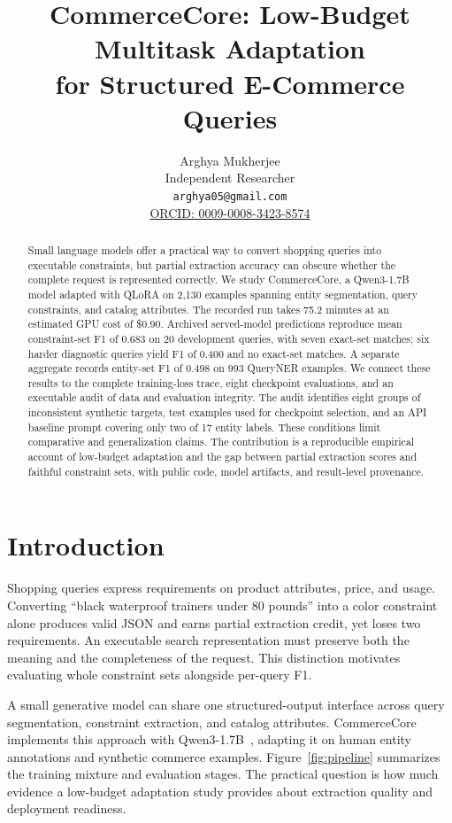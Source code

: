 \documentclass{article}
\title{CommerceCore: Low-Budget Multitask Adaptation\\for Structured E-Commerce Queries}
\author{Arghya Mukherjee\\Independent Researcher\\\texttt{arghya05@gmail.com}\\\href{https://orcid.org/0009-0008-3423-8574}{ORCID: 0009-0008-3423-8574}}
\begin{document}
\maketitle

\begin{abstract}
Small language models offer a practical way to convert shopping queries into executable constraints, but partial extraction accuracy can obscure whether the complete request is represented correctly. We study CommerceCore, a Qwen3-1.7B model adapted with QLoRA on 2,130 examples spanning entity segmentation, query constraints, and catalog attributes. The recorded run takes 75.2 minutes at an estimated GPU cost of \$0.90. Archived served-model predictions reproduce mean constraint-set F1 of 0.683 on 20 development queries, with seven exact-set matches; six harder diagnostic queries yield F1 of 0.400 and no exact-set matches. A separate aggregate records entity-set F1 of 0.498 on 993 QueryNER examples. We connect these results to the complete training-loss trace, eight checkpoint evaluations, and an executable audit of data and evaluation integrity. The audit identifies eight groups of inconsistent synthetic targets, test examples used for checkpoint selection, and an API baseline prompt covering only two of 17 entity labels. These conditions limit comparative and generalization claims. The contribution is a reproducible empirical account of low-budget adaptation and the gap between partial extraction scores and faithful constraint sets, with public code, model artifacts, and result-level provenance.
\end{abstract}

\section{Introduction}
\label{sec:intro}
Shopping queries express requirements on product attributes, price, and usage. Converting ``black waterproof trainers under 80 pounds'' into a color constraint alone produces valid JSON and earns partial extraction credit, yet loses two requirements. An executable search representation must preserve both the meaning and the completeness of the request. This distinction motivates evaluating whole constraint sets alongside per-query F1.

A small generative model can share one structured-output interface across query segmentation, constraint extraction, and catalog attributes. CommerceCore implements this approach with Qwen3-1.7B~\cite{qwen3,qwenmodel}, adapting it on human entity annotations and synthetic commerce examples. Figure~\ref{fig:pipeline} summarizes the training mixture and evaluation stages. The practical question is how much evidence a low-budget adaptation study provides about extraction quality and deployment readiness.
\end{document}
